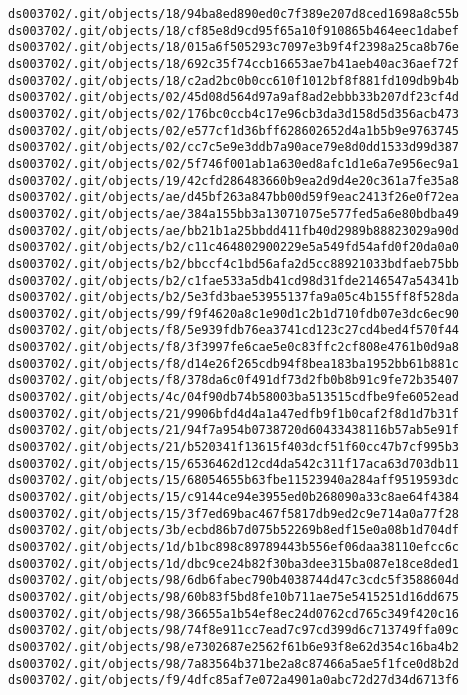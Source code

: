 \documentclass[11pt]{article}
\begin{document}
\begin{Verbatim}[commandchars=\\\{\}]
ds003702/.git/objects/18/94ba8ed890ed0c7f389e207d8ced1698a8c55b
ds003702/.git/objects/18/cf85e8d9cd95f65a10f910865b464eec1dabef
ds003702/.git/objects/18/015a6f505293c7097e3b9f4f2398a25ca8b76e
ds003702/.git/objects/18/692c35f74ccb16653ae7b41aeb40ac36aef72f
ds003702/.git/objects/18/c2ad2bc0b0cc610f1012bf8f881fd109db9b4b
ds003702/.git/objects/02/45d08d564d97a9af8ad2ebbb33b207df23cf4d
ds003702/.git/objects/02/176bc0ccb4c17e96cb3da3d158d5d356acb473
ds003702/.git/objects/02/e577cf1d36bff628602652d4a1b5b9e9763745
ds003702/.git/objects/02/cc7c5e9e3ddb7a90ace79e8d0dd1533d99d387
ds003702/.git/objects/02/5f746f001ab1a630ed8afc1d1e6a7e956ec9a1
ds003702/.git/objects/19/42cfd286483660b9ea2d9d4e20c361a7fe35a8
ds003702/.git/objects/ae/d45bf263a847bb00d59f9eac2413f26e0f72ea
ds003702/.git/objects/ae/384a155bb3a13071075e577fed5a6e80bdba49
ds003702/.git/objects/ae/bb21b1a25bbdd411fb40d2989b88823029a90d
ds003702/.git/objects/b2/c11c464802900229e5a549fd54afd0f20da0a0
ds003702/.git/objects/b2/bbccf4c1bd56afa2d5cc88921033bdfaeb75bb
ds003702/.git/objects/b2/c1fae533a5db41cd98d31fde2146547a54341b
ds003702/.git/objects/b2/5e3fd3bae53955137fa9a05c4b155ff8f528da
ds003702/.git/objects/99/f9f4620a8c1e90d1c2b1d710fdb07e3dc6ec90
ds003702/.git/objects/f8/5e939fdb76ea3741cd123c27cd4bed4f570f44
ds003702/.git/objects/f8/3f3997fe6cae5e0c83ffc2cf808e4761b0d9a8
ds003702/.git/objects/f8/d14e26f265cdb94f8bea183ba1952bb61b881c
ds003702/.git/objects/f8/378da6c0f491df73d2fb0b8b91c9fe72b35407
ds003702/.git/objects/4c/04f90db74b58003ba513515cdfbe9fe6052ead
ds003702/.git/objects/21/9906bfd4d4a1a47edfb9f1b0caf2f8d1d7b31f
ds003702/.git/objects/21/94f7a954b0738720d60433438116b57ab5e91f
ds003702/.git/objects/21/b520341f13615f403dcf51f60cc47b7cf995b3
ds003702/.git/objects/15/6536462d12cd4da542c311f17aca63d703db11
ds003702/.git/objects/15/68054655b63fbe11523940a284aff9519593dc
ds003702/.git/objects/15/c9144ce94e3955ed0b268090a33c8ae64f4384
ds003702/.git/objects/15/3f7ed69bac467f5817db9ed2c9e714a0a77f28
ds003702/.git/objects/3b/ecbd86b7d075b52269b8edf15e0a08b1d704df
ds003702/.git/objects/1d/b1bc898c89789443b556ef06daa38110efcc6c
ds003702/.git/objects/1d/dbc9ce24b82f30ba3dee315ba087e18ce8ded1
ds003702/.git/objects/98/6db6fabec790b4038744d47c3cdc5f3588604d
ds003702/.git/objects/98/60b83f5bd8fe10b711ae75e5415251d16dd675
ds003702/.git/objects/98/36655a1b54ef8ec24d0762cd765c349f420c16
ds003702/.git/objects/98/74f8e911cc7ead7c97cd399d6c713749ffa09c
ds003702/.git/objects/98/e7302687e2562f61b6e93f8e62d354c16ba4b2
ds003702/.git/objects/98/7a83564b371be2a8c87466a5ae5f1fce0d8b2d
ds003702/.git/objects/f9/4dfc85af7e072a4901a0abc72d27d34d6713f6

\end{Verbatim}
\end{document}
